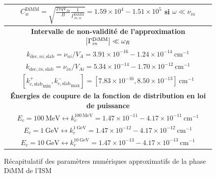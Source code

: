 \documentclass[10pt,a4paper]{article}
\begin{document}
\begin{figure}[h]
\begin{tabular}{|c|}
$C^\mathrm{DiMM}_w = \sqrt{\frac{2\pi qV_{Ai}}{B} \frac{1}{\Gamma^\mathrm{DiMM}_{in,w}}} = 1.59\times 10^4 - 1.51 \times 10^5$ si $\omega \ll \nu_{in}$ \\ 
\hline 
\hline
\bf{Intervalle de non-validité de l'approximation $\abs{\Gamma^\mathrm{DiMM}_{in}} \ll \omega_R$} \\ 
\hline
$k_{\mathrm{dec},ni,\mathrm{slab}} = \nu_{ni}/V_A = 3.91\times 10^{-16} - 1.24 \times 10^{-14} ~ \mathrm{cm}^{-1}$ \\ 
$k_{\mathrm{dec},in,\mathrm{slab}} = \nu_{in}/V_{Ai} = 5.34\times 10^{-14} - 1.70 \times 10^{-12} ~ \mathrm{cm}^{-1}$ \\ 
$\left[{k^+_{c,\mathrm{slab}}}_\mathrm{min}, {k^-_{c,\mathrm{slab}}}_\mathrm{max} \right] = [7.83 \times 10^{-16}, 8.50\times 10^{-13}] ~ \mathrm{cm}^{-1}$ \\ 
\hline
\hline
\bf{Énergies de coupure de la fonction de distribution en loi de puissance} \\ 
\hline
$E_c = 100~\mathrm{MeV} \leftrightarrow k^{100~\mathrm{MeV}}_c = 1.47\times 10^{-11} - 4.17 \times 10^{-11}~\mathrm{cm}^{-1}$ \\ 
$E_c = 1~\mathrm{GeV} \leftrightarrow k^{1~\mathrm{GeV}}_c = 1.47\times 10^{-12} - 4.17 \times 10^{-12} ~\mathrm{cm}^{-1}$     \\ 
$E_c = 10~\mathrm{GeV} \leftrightarrow k^{10~\mathrm{GeV}}_c = 1.47\times 10^{-13} - 4.17 \times 10^{-13}~\mathrm{cm}^{-1}$   \\ 
\hline

\end{tabular}
\caption{Récapitulatif des paramètres numériques approximatifs de la phase DiMM de l'ISM} 
\label{param_DiMM}
\end{figure}
\end{document}
